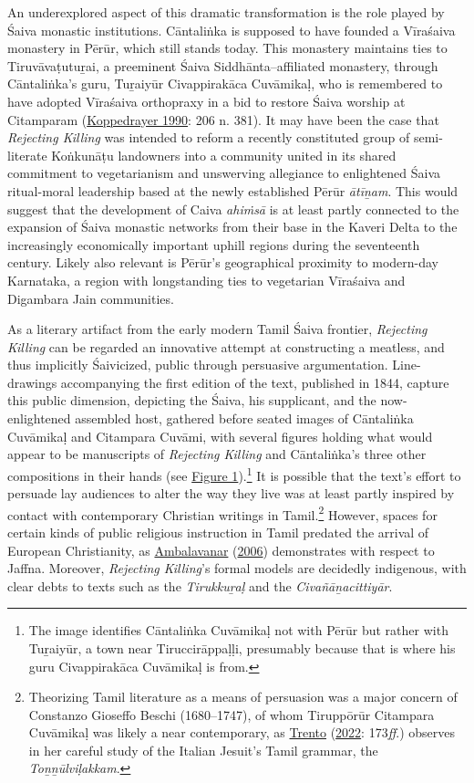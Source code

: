 An underexplored aspect of this dramatic transformation is the role played by Śaiva monastic institutions. Cāntaliṅka is supposed to have founded a Vīraśaiva monastery in Pērūr, which still stands today. This monastery maintains ties to Tiruvāvaṭutuṟai, a preeminent Śaiva Siddhānta–affiliated monastery, through Cāntaliṅka’s guru, Tuṟaiyūr Civappirakāca Cuvāmikaḷ, who is remembered to have adopted Vīraśaiva orthopraxy in a bid to restore Śaiva worship at Citamparam (\hyperref[Koppedrayer1990]{Koppedrayer 1990}: 206 n. 381). It may have been the case that \emph{Rejecting Killing} was intended to reform a recently constituted group of semi-literate Koṅkunāṭu landowners into a community united in its shared commitment to vegetarianism and unswerving allegiance to enlightened Śaiva ritual-moral leadership based at the newly established Pērūr \emph{ātīṉam}. This would suggest that the development of Caiva \emph{ahiṁsā} is at least partly connected to the expansion of Śaiva monastic networks from their base in the Kaveri Delta to the increasingly economically important uphill regions during the seventeenth century. Likely also relevant is Pērūr’s geographical proximity to modern-day Karnataka, a region with longstanding ties to vegetarian Vīraśaiva and Digambara Jain communities.


As a literary artifact from the early modern Tamil Śaiva frontier, \emph{Rejecting Killing} can be regarded an innovative attempt at constructing a meatless, and thus implicitly Śaivicized, public through persuasive argumentation. Line-drawings accompanying the first edition of the text, published in 1844, capture this public dimension, depicting the Śaiva, his supplicant, and the now-enlightened assembled host, gathered before seated images of Cāntaliṅka Cuvāmikaḷ and Citampara Cuvāmi, with several figures holding what would appear to be manuscripts of \emph{Rejecting Killing} and Cāntaliṅka’s three other compositions in their hands (see \hyperref[fig1]{Figure 1}).\footnote{%
The image identifies Cāntaliṅka Cuvāmikaḷ not with Pērūr but rather with Tuṟaiyūr, a town near Tiruccirāppaḷḷi, presumably because that is where his guru Civappirakāca Cuvāmikaḷ is from.
}
 It is possible that the text’s effort to persuade lay audiences to alter the way they live was at least partly inspired by contact with contemporary Christian writings in Tamil.\footnote{%
Theorizing Tamil literature as a means of persuasion was a major concern of Constanzo Gioseffo Beschi (1680–1747), of whom Tiruppōrūr Citampara Cuvāmikaḷ was likely a near contemporary, as \hyperref[Trento2022]{Trento} (\hyperref[Trento2022]{2022}: 173\emph{ff}.) observes in her careful study of the Italian Jesuit’s Tamil grammar, the \emph{{Toṉṉūlviḷakkam}}.
}
 However, spaces for certain kinds of public religious instruction in Tamil predated the arrival of European Christianity, as \hyperref[Ambalavanar2006]{Ambalavanar} (\hyperref[Ambalavanar2006]{2006}) demonstrates with respect to Jaffna. Moreover, \emph{Rejecting Killing}’s formal models are decidedly indigenous, with clear debts to texts such as the \emph{{Tirukkuṟaḷ}} and the \emph{{Civañāṉacittiyār}}. 

